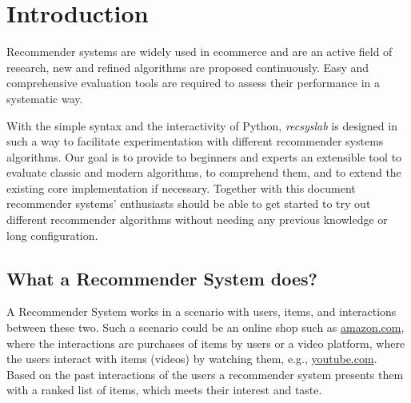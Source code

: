 \chapter{Introduction}
Recommender systems are widely used in ecommerce and are an active field of research, new and refined algorithms are proposed continuously. Easy and comprehensive evaluation tools are required to assess their performance in a systematic way.  

With the simple syntax and the interactivity
of Python, \textit{recsyslab} is designed in such a way to facilitate experimentation with different recommender systems
algorithms. Our goal is to provide to beginners and experts an extensible tool to evaluate classic and modern algorithms, to comprehend them, and to extend the existing core implementation if necessary. Together with this document recommender systems' enthusiasts should be able to get started to try out different recommender algorithms
without needing any previous knowledge or long configuration.


\section{What a Recommender System does?}
A Recommender System works in a scenario with users, items, and interactions
between these two. Such a scenario could be an online shop such as \url{amazon.com},
where the interactions are purchases of items by users or a video
platform, where the users interact with items (videos) by watching
them, e.g., \url{youtube.com}. Based on the past interactions of the users
a recommender system presents them with a ranked list of items, which meets their interest and taste.

